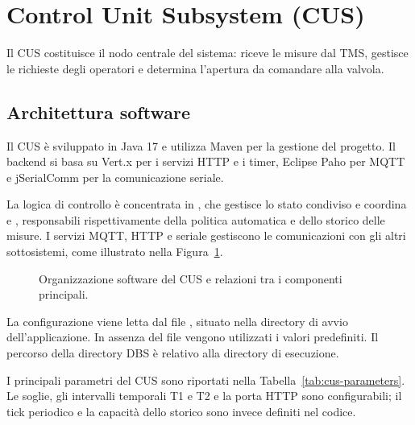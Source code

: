 
\section{Control Unit Subsystem (CUS)}%
\label{sec:cus}

Il CUS costituisce il nodo centrale del sistema: riceve le misure dal TMS, gestisce le richieste degli operatori e determina l'apertura da comandare alla valvola.

\subsection{Architettura software}

Il CUS è sviluppato in Java 17 e utilizza Maven per la gestione del progetto. Il backend si basa su Vert.x per i servizi HTTP e i timer, Eclipse Paho per MQTT e jSerialComm per la comunicazione seriale.

La logica di controllo è concentrata in , che gestisce lo stato condiviso e coordina  e , responsabili rispettivamente della politica automatica e dello storico delle misure.
I servizi MQTT, HTTP e seriale gestiscono le comunicazioni con gli altri sottosistemi, come illustrato nella Figura~\ref{fig:cus-components}.

\begin{figure}[htbp]
\centering

\caption{Organizzazione software del CUS e relazioni tra
i componenti principali.}%
\label{fig:cus-components}
\end{figure}

La configurazione viene letta dal file , situato nella directory di avvio dell'applicazione.
In assenza del file vengono utilizzati i valori predefiniti.
Il percorso della directory DBS è relativo alla directory di esecuzione.

I principali parametri del CUS sono riportati nella Tabella~\ref{tab:cus-parameters}.
Le soglie, gli intervalli temporali T1 e T2 e la porta HTTP sono configurabili; il tick periodico e la capacità dello storico sono invece definiti nel codice.


